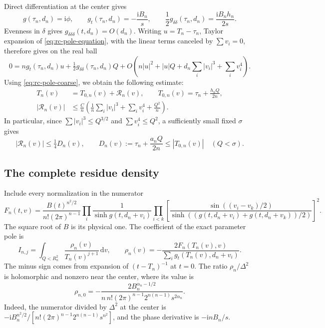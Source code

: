 \documentclass[11pt]{article}
\numberwithin{equation}{section}
\theoremstyle{definition}
\newcommand{\dd}{\,\mathrm d}
\newcommand{\ii}{\mathrm i}
\begin{document}
Direct differentiation at the center gives
\[
 g(\tau_n,d_n)=\ii\phi,\qquad
 g_t(\tau_n,d_n)=-\frac{\ii B_n}{s},\qquad
 \frac12g_{\delta\delta}(\tau_n,d_n)=\frac{\ii B_nh_n}{2s}.
\]
Evenness in $\delta$ gives $g_{\delta\delta\delta}(t,d_n)=O(d_n)$.
Writing $u=T_n-\tau_n$, Taylor expansion of
\eqref{eq:rc-pole-equation}, with the linear terms canceled by
$\sum v_i=0$, therefore gives on the real ball
\[
 0=ng_t(\tau_n,d_n)u+\tfrac12g_{\delta\delta}(\tau_n,d_n)Q
 +O\left(n|u|^2+|u|Q+d_n\sum_i|v_i|^3+\sum_i v_i^4\right).
\]
Using \eqref{eq:rc-pole-coarse}, we obtain the following estimate:
\begin{equation}\label{eq:rc-pole-error}
 \begin{split}
 T_n(v)&=T_{0,n}(v)+\mathcal R_n(v),\qquad
 T_{0,n}(v)=\tau_n+\frac{h_nQ}{2n},\\
 |\mathcal R_n(v)|&\le\frac Cn\left(
       \frac1n\sum_i|v_i|^3+\sum_i v_i^4+\frac{Q^2}{n}\right).
 \end{split}
\end{equation}
In particular, since $\sum|v_i|^3\le Q^{3/2}$ and
$\sum v_i^4\le Q^2$, a sufficiently small fixed $\sigma$ gives
\begin{equation}\label{eq:rc-small-error}
 |\mathcal R_n(v)|\le\tfrac14D_n(v),\qquad
 D_n(v):=\tau_n+\frac{a_nQ}{2n}\le |T_{0,n}(v)|
 \quad(Q<\sigma).
\end{equation}

\subsection{The complete residue density}

Include every normalization in the numerator
\begin{equation}\label{eq:rc-numerator}
 F_n(t,v)=\frac{B(t)^{n^2/2}}{n!(2\pi)^{n-1}}
 \prod_i\frac1{\sinh g(t,d_n+v_i)}
 \prod_{i<k}\left[
 \frac{\sin((v_i-v_k)/2)}
 {\sinh((g(t,d_n+v_i)+g(t,d_n+v_k))/2)}\right]^2.
\end{equation}
The square root of $B$ is its physical one.  The coefficient of the
exact parameter pole is
\begin{equation}\label{eq:rc-residue}
 I_{n,j}=\int_{Q<R_n^2}\frac{\rho_n(v)}{T_n(v)^{j+1}}\dd v,
 \qquad
 \rho_n(v)=-\frac{2F_n(T_n(v),v)}
 {\sum_i g_t(T_n(v),d_n+v_i)}.
\end{equation}
The minus sign comes from expansion of $(t-T_n)^{-1}$ at $t=0$.
The ratio $\rho_n/\Delta^2$ is holomorphic and nonzero near the
center, where its value is
\begin{equation}\label{eq:rc-center-density}
 \rho_{n,0}=-\frac{2B_n^{\alpha_n-1/2}}
 {n\,n!(2\pi)^{n-1}2^{n(n-1)}s^{2\alpha_n}}.
\end{equation}
Indeed, the numerator divided by $\Delta^2$ at the center is
$-\ii B_n^{n^2/2}/[n!(2\pi)^{n-1}2^{n(n-1)}s^{n^2}]$,
and the phase derivative is $-\ii nB_n/s$.
\end{document}
